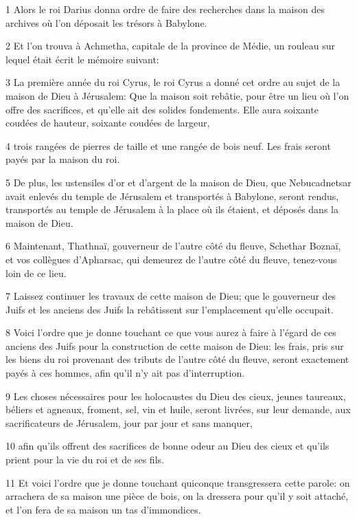 \par 1 Alors le roi Darius donna ordre de faire des recherches dans la maison des archives où l'on déposait les trésors à Babylone.
\par 2 Et l'on trouva à Achmetha, capitale de la province de Médie, un rouleau sur lequel était écrit le mémoire suivant:
\par 3 La première année du roi Cyrus, le roi Cyrus a donné cet ordre au sujet de la maison de Dieu à Jérusalem: Que la maison soit rebâtie, pour être un lieu où l'on offre des sacrifices, et qu'elle ait des solides fondements. Elle aura soixante coudées de hauteur, soixante coudées de largeur,
\par 4 trois rangées de pierres de taille et une rangée de bois neuf. Les frais seront payés par la maison du roi.
\par 5 De plus, les ustensiles d'or et d'argent de la maison de Dieu, que Nebucadnetsar avait enlevés du temple de Jérusalem et transportés à Babylone, seront rendus, transportés au temple de Jérusalem à la place où ils étaient, et déposés dans la maison de Dieu.
\par 6 Maintenant, Thathnaï, gouverneur de l'autre côté du fleuve, Schethar Boznaï, et vos collègues d'Apharsac, qui demeurez de l'autre côté du fleuve, tenez-vous loin de ce lieu.
\par 7 Laissez continuer les travaux de cette maison de Dieu; que le gouverneur des Juifs et les anciens des Juifs la rebâtissent sur l'emplacement qu'elle occupait.
\par 8 Voici l'ordre que je donne touchant ce que vous aurez à faire à l'égard de ces anciens des Juifs pour la construction de cette maison de Dieu: les frais, pris sur les biens du roi provenant des tributs de l'autre côté du fleuve, seront exactement payés à ces hommes, afin qu'il n'y ait pas d'interruption.
\par 9 Les choses nécessaires pour les holocaustes du Dieu des cieux, jeunes taureaux, béliers et agneaux, froment, sel, vin et huile, seront livrées, sur leur demande, aux sacrificateurs de Jérusalem, jour par jour et sans manquer,
\par 10 afin qu'ils offrent des sacrifices de bonne odeur au Dieu des cieux et qu'ils prient pour la vie du roi et de ses fils.
\par 11 Et voici l'ordre que je donne touchant quiconque transgressera cette parole: on arrachera de sa maison une pièce de bois, on la dressera pour qu'il y soit attaché, et l'on fera de sa maison un tas d'immondices.

